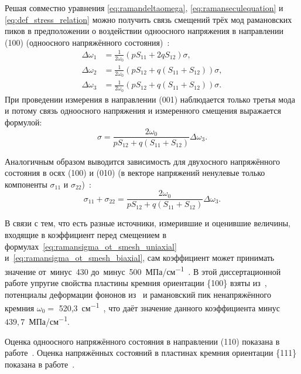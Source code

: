 Решая совместно уравнения \eqref{eq:ramandeltaomega},
\eqref{eq:ramanseculequation} и  \eqref{eq:def_stress_relation} можно получить
связь смещений трёх мод рамановских пиков в предположении о воздействии
одноосного напряжения в направлении (100) (одноосного напряжённого
состояния)~\cite{DeWolf1999}:
\begin{equation}
    \begin{aligned}
    \Delta\omega_1 &= \frac{1}{2\omega_0} (p S_{11} + 2q S_{12})\sigma,\\
    \Delta\omega_2 &= \frac{1}{2\omega_0} (p S_{12} + q(S_{11} + S_{12})) \sigma,\\
    \Delta\omega_3 &= \frac{1}{2\omega_0} (p S_{12} + q(S_{11} + S_{12})) \sigma.
    \end{aligned}
\end{equation}
При проведении измерения в направлении (001) наблюдается только третья мода и
потому связь одноосного напряжения и измеренного смещения выражается формулой:
\begin{equation}\label{eq:ramansigma_ot_smesh_uniaxial}
\sigma = \frac{2\omega_0}{p S_{12} + q(S_{11} + S_{12})} \Delta\omega_3.
\end{equation}

Аналогичным образом выводится зависимость для двухосного напряжённого состояния
в осях (100) и (010) (в векторе напряжений ненулевые только компоненты
\(\sigma_{11}\) и \(\sigma_{22}\))~\cite{DeWolf1996integcirc}:
\begin{equation}\label{eq:ramansigma_ot_smesh_biaxial}
\sigma_{11} + \sigma_{22} = \frac{2\omega_0}{p S_{12} + q(S_{11} + S_{12})} \Delta\omega_3.
\end{equation}

В связи с тем, что есть разные источники, измерившие и оценившие величины,
входящие в коэффициент перед смещением в
формулах~\eqref{eq:ramansigma_ot_smesh_uniaxial}
и~\eqref{eq:ramansigma_ot_smesh_biaxial}, сам коэффициент может принимать
значение от~минус~430 до~минус~500~МПа/см\textsuperscript{$-$1}~\cite{Naka2015}.
В этой диссертационной работе упругие
свойства пластины кремния ориентации \{100\} взяты
из~\cites[42]{Bao_part_Mech_Beam_Diaphragm_Structures}, потенциалы
деформации фононов из~\cite{Anastassakis1990} и рамановский пик
ненапряжённого кремния $\omega_0=$ 520,3~см\textsuperscript{$-$1}~\cite{Loechelt1999},
что даёт значение данного
коэффициента минус \(439,7\)~МПа/см\textsuperscript{$-$1}.

Оценка одноосного напряжённого состояния в направлении (110) показана в
работе~\cite{DeWolf1996}. Оценка напряжённых состояний в пластинах кремния
ориентации \{111\} показана в работе~\cite{Narayanan1997}.

